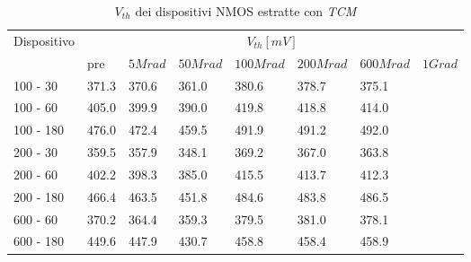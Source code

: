 \documentclass[12pt, letterpaper]{book}
\begin{document}
\begin{table}[H]
  \renewcommand{\arraystretch}{1.3}
  \begin{tabular}{m{2cm} m{0.8cm} m{1.1cm} m{1.3cm} m{1.5cm} m{1.5cm} m{1.5cm} m{1cm}}
    \toprule
    \multirow{2}{*}{Dispositivo} & \multicolumn{7}{c}{$V_{th} [mV] $}                                                                    \\
    \cmidrule{2-8}
                                 & pre                                & $5Mrad$ & $50Mrad$ & $100Mrad$ & $200Mrad$ & $600Mrad$ & $1Grad$ \\
    \midrule
    100 - 30                     & 371.3                              & 370.6   & 361.0    & 380.6     & 378.7     &  375.1         &         \\
    \hline
    100 - 60                     & 405.0                              & 399.9   & 390.0    & 419.8     & 418.8     &  414.0         &         \\
    \hline
    100 - 180                    & 476.0                              & 472.4   & 459.5    & 491.9     & 491.2     &  492.0         &         \\
    \hline
    200 - 30                     & 359.5                              & 357.9   & 348.1    & 369.2     & 367.0     &  363.8         &         \\
    \hline
    200 - 60                     & 402.2                              & 398.3   & 385.0    & 415.5     & 413.7     &  412.3         &         \\
    \hline
    200 - 180                    & 466.4                              & 463.5   & 451.8    & 484.6     & 483.8     &  486.5         &         \\
    \hline
    600 - 60                     & 370.2                              & 364.4   & 359.3    & 379.5     & 381.0     &  378.1         &         \\
    \hline
    600 - 180                    & 449.6                              & 447.9   & 430.7    & 458.8     & 458.4     &  458.9         &         \\
    \bottomrule
  \end{tabular}
  \caption{$V_{th}$ dei dispositivi NMOS estratte con \emph{TCM}}
  \label{tab:VthTCMN}
\end{table}
\end{document}
